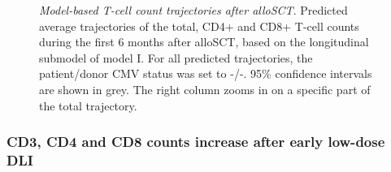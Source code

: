 \documentclass[
  letterpaper,
  paper=240mm:170mm,
  twoside=true,
  open=right,
  fontsize=10pt,
  pagesize=false,
  BCOR=15mm,
  DIV=14,
  headinclude=true,
  footinclude=false,
  headsepline=on]{scrbook}
\begin{document}
\begin{figure}


\caption{\label{fig-DLI-three}\emph{Model-based T-cell count
trajectories after alloSCT}. Predicted average trajectories of the
total, CD4+ and CD8+ T-cell counts during the first 6 months after
alloSCT, based on the longitudinal submodel of model I. For all
predicted trajectories, the patient/donor CMV status was set to -/-.
95\% confidence intervals are shown in grey. The right column zooms in
on a specific part of the total trajectory.}

\end{figure}%

\subsubsection{CD3, CD4 and CD8 counts increase after early low-dose
DLI}\label{cd3-cd4-and-cd8-counts-increase-after-early-low-dose-dli}
\end{document}
